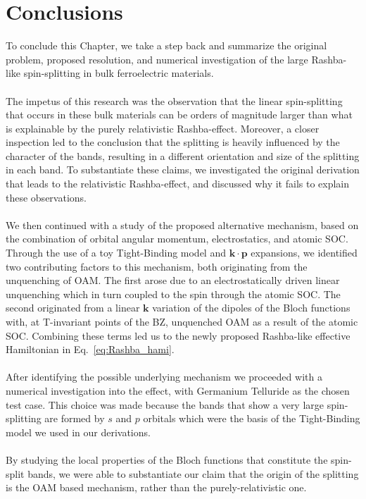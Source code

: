 \section{Conclusions}
To conclude this Chapter, we take a step back and summarize the original problem, proposed resolution, and numerical investigation of the large Rashba-like spin-splitting in bulk ferroelectric materials.
\\\\
The impetus of this research was the observation that the linear spin-splitting that occurs in these bulk materials can be orders of magnitude larger than what is explainable by the purely relativistic Rashba-effect.
Moreover, a closer inspection led to the conclusion that the splitting is heavily influenced by the character of the bands, resulting in a different orientation and size of the splitting in each band.
To substantiate these claims, we investigated the original derivation that leads to the relativistic Rashba-effect, and discussed why it fails to explain these observations.
\\\\
We then continued with a study of the proposed alternative mechanism, based on the combination of orbital angular momentum, electrostatics, and atomic SOC.
Through the use of a toy Tight-Binding model and $\bm k \cdot \bm p$ expansions, we identified two contributing factors to this mechanism, both originating from the unquenching of OAM.
The first arose due to an electrostatically driven linear unquenching which in turn coupled to the spin through the atomic SOC.
The second originated from a linear $\bm k$ variation of the dipoles of the Bloch functions with, at T-invariant points of the BZ, unquenched OAM as a result of the atomic SOC.
Combining these terms led us to the newly proposed Rashba-like effective Hamiltonian in Eq.~\eqref{eq:Rashba_hami}.
\\\\
After identifying the possible underlying mechanism we proceeded with a numerical investigation into the effect, with Germanium Telluride as the chosen test case.
This choice was made because the bands that show a very large spin-splitting are formed by $s$ and $p$ orbitals which were the basis of the Tight-Binding model we used in our derivations.
\\\\
By studying the local properties of the Bloch functions that constitute the spin-split bands, we were able to substantiate our claim that the origin of the splitting is the OAM based mechanism, rather than the purely-relativistic one.
